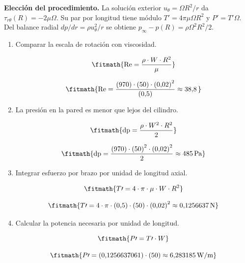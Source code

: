 \noindent\textbf{Elección del procedimiento.} La solución exterior $u_\theta=\Omega R^2/r$ da $\tau_{r\theta}(R)=-2\mu\Omega$. Su par por longitud tiene módulo $T\prime=4\pi\mu\Omega R^2$ y $P\prime=T\prime\Omega$. Del balance radial $dp/dr=\rho u_\theta^2/r$ se obtiene $p_\infty-p(R)=\rho\Omega^2R^2/2$.

\begin{enumerate}

\item Comparar la escala de rotación con viscosidad.

\[\fitmath{\mathrm{Re}=\frac{\rho\cdot W\cdot {R}^{2}}{\mu}}\]

\[\fitmath{\mathrm{Re}=\frac{(970)\cdot (50)\cdot {(0{,}02)}^{2}}{(0{,}5)}\approx 38{,}8\,}\]

\item La presión en la pared es menor que lejos del cilindro.

\[\fitmath{\mathrm{dp}=\frac{\rho\cdot {W}^{2}\cdot {R}^{2}}{2}}\]

\[\fitmath{\mathrm{dp}=\frac{(970)\cdot {(50)}^{2}\cdot {(0{,}02)}^{2}}{2}\approx 485\,\mathrm{Pa}}\]

\item Integrar esfuerzo por brazo por unidad de longitud axial.

\[\fitmath{T\prime=4\cdot \pi\cdot \mu\cdot W\cdot {R}^{2}}\]

\[\fitmath{T\prime=4\cdot \pi\cdot (0{,}5)\cdot (50)\cdot {(0{,}02)}^{2}\approx 0{,}1256637\,\mathrm{N}}\]

\item Calcular la potencia necesaria por unidad de longitud.

\[\fitmath{P\prime=T\prime\cdot W}\]

\[\fitmath{P\prime=(0{,}1256637061)\cdot (50)\approx 6{,}283185\,\mathrm{W/m}}\]

\end{enumerate}
